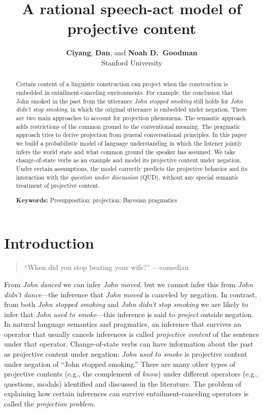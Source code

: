 \documentclass[10pt,letterpaper]{article}
\title{A rational speech-act model of projective content}
\author{{\large \bf Ciyang}, {\large \bf Dan}, and {\large \bf Noah D.~Goodman}\\
Stanford University}
\begin{document}
\maketitle
 
\begin{abstract}
Certain content of a linguistic construction can project when the construction is embedded in entailment-canceling environments.
 For example, the conclusion that John smoked in the past from the utterance \emph{John stopped smoking} 
 still holds for \emph{John didn't stop smoking}, in which the original utterance is 
 embedded under negation. 
 There are two main approaches to account for projection phenomena. 
 The semantic approach adds restrictions of the common ground to the conventional meaning.
 The pragmatic approach tries to derive projection from general conversational principles. 
 In this paper we build a probabilistic model of language understanding in which the listener 
  jointly infers the world state and what common ground the speaker has assumed. 
 We take change-of-state verbs as an example and model its projective content under negation. 
 Under certain assumptions, the model correctly predicts the projective behavior and its interaction with 
  the \emph{question under discussion} (QUD), without any special semantic treatment of projective content.

\textbf{Keywords:} 
Presupposition; projection; Bayesian pragmatics
\end{abstract}

\section{Introduction}
\label{sec:Intro}

\begin{quotation}
``When did you stop beating your wife?'' ---comedian
\end{quotation}

From \emph{John danced} we can infer \emph{John moved}, but we cannot infer this from \emph{John didn't dance}---the inference that \emph{John moved} is canceled by negation.
In contrast, from both \emph{John stopped smoking} and \emph{John didn't stop smoking} we are likely to infer that \emph{John used to smoke}---this inference is said to \emph{project} outside negation.
In natural language semantics and pragmatics, an inference that survives an operator that usually cancels inferences is called
 \emph{projective content} of the sentence under that operator. 
Change-of-state verbs can have information about the past as projective content under negation: \emph{John used to smoke} is projective content under negation of ``John stopped smoking.'' 
There are many other types of projective contents 
 (e.g., the complement of \emph{know}) under different operators 
 (e.g., questions, modals) identified and discussed in the literature. 
The problem of explaining how certain inferences can
 survive entailment-canceling operators is called the \emph{projection problem}.
\end{document}

